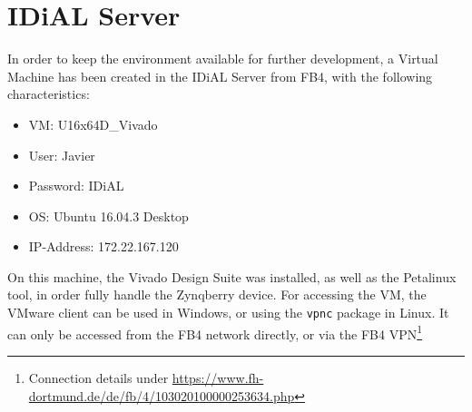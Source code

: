 

\section{IDiAL Server}

In order to keep the environment available for further development, a Virtual Machine has been created in the IDiAL Server from FB4, with the following characteristics:

\begin{itemize}
	\item VM: U16x64D\_Vivado
	\item User: Javier
	\item Password: IDiAL
	\item OS: Ubuntu 16.04.3 Desktop
	\item IP-Address: 172.22.167.120
\end{itemize}

On this machine, the Vivado Design Suite was installed, as well as the Petalinux tool, in order fully handle the Zynqberry device. For accessing the VM, the VMware client can be used in Windows, or using the \texttt{vpnc} package in Linux. It can only be accessed from the FB4 network directly, or via the FB4 VPN\footnote{Connection details under \underline{https://www.fh-dortmund.de/de/fb/4/103020100000253634.php}}
